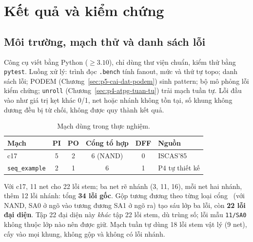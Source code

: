 \chapter{Kết quả và kiểm chứng}
\label{sec:p6-ket-qua}

\section{Môi trường, mạch thử và danh sách lỗi}
\label{sec:p6-mach-loi}
Công cụ viết bằng Python ($\ge 3.10$), chỉ dùng thư viện chuẩn, kiểm thử bằng
\texttt{pytest}. Luồng xử lý: trình đọc \texttt{.bench} tính fanout, mức và thứ
tự topo; danh sách lỗi; PODEM (Chương~\ref{sec:p5-cai-dat-podem}) sinh pattern;
bộ mô phỏng lỗi kiểm chứng; \texttt{unroll} (Chương~\ref{sec:p4-atpg-tuan-tu})
trải mạch tuần tự. Lỗi đầu vào như giá trị kẹt khác 0/1, net hoặc nhánh không
tồn tại, số khung không dương đều bị từ chối, không được quy thành kết quả.
\begin{table}[H]
\centering
\caption{Mạch dùng trong thực nghiệm.}
\label{tab:p6-mach}
\begin{tabular}{@{}lccccl@{}}
\toprule
Mạch & PI & PO & Cổng tổ hợp & DFF & Nguồn\\
\midrule
c17 & 5 & 2 & 6 (NAND) & 0 & ISCAS'85~\cite{p6_brglez1985}\\
\texttt{seq\_example} & 2 & 1 & 6 & 1 & P4 tự thiết kế\\
\bottomrule
\end{tabular}
\end{table}
Với c17, 11 net cho 22 lỗi stem; ba net rẽ nhánh (3, 11, 16), mỗi net hai
nhánh, thêm 12 lỗi nhánh: tổng \textbf{34 lỗi gốc}. Gộp tương đương theo từng
loại cổng~\cite[pp.~12--14]{p1_wang2006} (với NAND, SA0 ở ngõ vào tương đương
SA1 ở ngõ ra) tạo sáu lớp ba lỗi, còn \textbf{22 lỗi đại diện}. Tập 22 đại
diện này \emph{khác} tập 22 lỗi stem, dù trùng số; lỗi mẫu \texttt{11/SA0}
không thuộc lớp nào nên được giữ. Mạch tuần tự dùng 18 lỗi stem vật lý (9 net),
cấy vào mọi khung, không gộp và không có lỗi nhánh.

